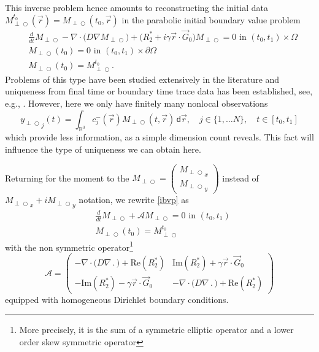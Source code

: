 \documentclass{ws-m3as}
\renewcommand\Re{\mathrm{Re}}
\renewcommand\Im{\mathrm{Im}}
\def\Mpp{M_{\perp\!\!\!\!\!\bigcirc}}
\def\yp{y_{\perp\!\!\!\!\!\bigcirc}}
\begin{document}
This inverse problem hence amounts to reconstructing the initial data $\Mpp^{t_0}(\vec r)=\Mpp(t_0,\vec r)$ in the parabolic initial boundary value problem
\begin{equation}\label{ibvp}
\begin{aligned}
&\frac{d}{dt}\Mpp
-\nabla\cdot\bigl(D \nabla \Mpp\bigr) +\bigl(R_2^*+i\gamma\vec r \cdot \vec G_0\bigr)\Mpp=0\text{ in }(t_0,t_1)\times\Omega\\
&\Mpp(t_0)=0\text{ in }(t_0,t_1)\times\partial\Omega\\
&\Mpp(t_0)=\Mpp^{t_0}.
\end{aligned}
\end{equation}
Problems of this type have been studied extensively in the literature and uniqueness from final time or boundary time trace data has been established, see, e.g., \cite{BukhgeimKlibanov:1981,ImanuvilovYamamoto:1998,Isakov:2006}.
However, here we only have finitely many nonlocal observations
\begin{equation}\label{obs_D}
{\yp}_j(t)=\int_{\mathbb{R}^3} c^-_j(\vec r) \Mpp(t, \vec r) \,\textsf{d}\vec r, \quad j\in\{1,\ldots N\}, \quad t\in[t_0,t_1]
\end{equation}
which provide less information, as a simple dimension count reveals.
This fact will influence the type of uniqueness we can obtain here.

Returning for the moment to the 
$\Mpp=\left(\begin{array}{c}{\Mpp}_x\\ {\Mpp}_y\end{array}\right)$ instead of 
${\Mpp}_x+i{\Mpp}_y$ 
notation, we rewrite \eqref{ibvp} as 
\begin{equation}\label{abstractODE}
\begin{aligned}
&\frac{d}{dt}\Mpp+\mathcal{A}\Mpp =0\text{ in }(t_0,t_1)\\
&\Mpp(t_0)=\Mpp^{t_0}
\end{aligned}
\end{equation}
with the non symmetric operator\footnote{More precisely, it is the sum of a symmetric elliptic operator and a lower order skew symmetric operator}
\begin{equation}\label{mathcalA}
\mathcal{A}=
\left(\begin{array}{cc}
-\nabla\cdot\bigl(D \nabla \,.\,\bigr)+\Re(R_2^*)&\Im(R_2^*)+\gamma\vec r \cdot \vec G_0\\ 
-\Im(R_2^*)-\gamma\vec r \cdot \vec G_0&-\nabla\cdot\bigl(D \nabla \,.\,\bigr)+\Re(R_2^*)
\end{array}\right)
\end{equation}
equipped with homogeneous Dirichlet boundary conditions.
\end{document}
